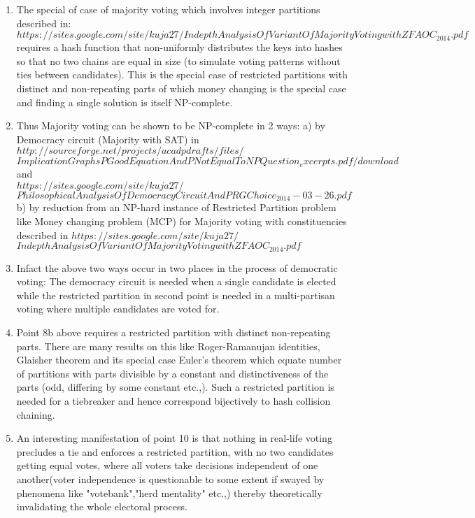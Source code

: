\documentclass[11pt,onecolumn]{article}
\begin{document}
\begin{enumerate}
\item The special of case of majority voting which involves 
integer partitions described in: $https://sites.google.com/site/kuja27/
IndepthAnalysisOfVariantOfMajorityVotingwithZFAOC_2014.pdf$ requires a 
hash function that non-uniformly distributes the keys into hashes 
so that no two chains are equal in size (to simulate voting patterns without 
ties between candidates). This is the special case of restricted partitions 
with distinct and non-repeating parts of which money changing is the special 
case and finding a single solution is itself NP-complete. 

\item Thus Majority voting can be shown to be NP-complete in 2 ways:
	a) by Democracy circuit (Majority with SAT) in \\
	$http://sourceforge.net/projects/acadpdrafts/files/$ \\ 
$ImplicationGraphsPGoodEquationAndPNotEqualToNPQuestion_excerpts.pdf/download$ and \\ $https://sites.google.com/site/kuja27/$ \\
$PhilosophicalAnalysisOfDemocracyCircuitAndPRGChoice_2014-03-26.pdf$
	b) by reduction from an NP-hard instance of Restricted Partition 
	problem like Money changing problem (MCP) for Majority voting with constituencies described in 
	$https://sites.google.com/site/kuja27/$ \\
	$IndepthAnalysisOfVariantOfMajorityVotingwithZFAOC_2014.pdf$


\item Infact the above two ways occur in two places in the process of democratic voting: The democracy circuit is needed when a single candidate is elected while the restricted partition in second point is needed in a multi-partisan voting where multiple candidates are voted for.

\item Point 8b above requires a restricted partition with distinct non-repeating parts. There are many results on this like Roger-Ramanujan identities, Glaisher theorem and its special case Euler's theorem which equate number of partitions with parts divisible by a constant and distinctiveness of the parts (odd, differing by some constant etc.,). Such a restricted partition is needed for a tiebreaker and hence correspond bijectively to  hash collision chaining.

\item An interesting manifestation of point 10 is that nothing in real-life voting precludes a tie and enforces a restricted partition, with no two candidates getting equal votes, where all voters take decisions independent of one another(voter independence is questionable to some extent if swayed by phenomena like "votebank","herd mentality" etc.,) thereby theoretically invalidating the whole electoral process. 


\end{enumerate}
\end{document}

